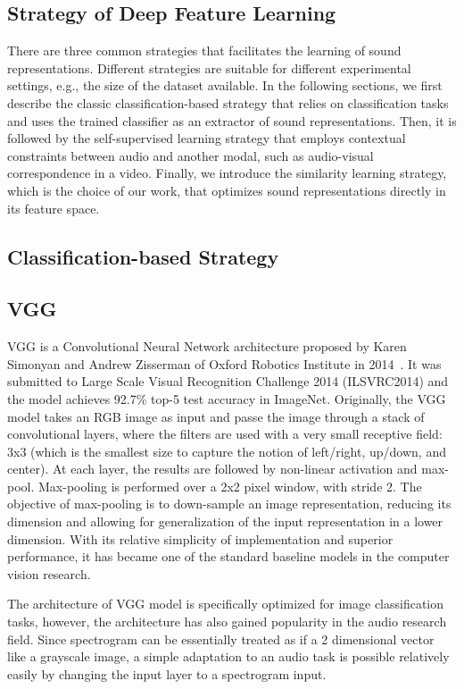 \subsection{Strategy of Deep Feature Learning}
There are three common strategies that facilitates the learning of sound representations. Different strategies are suitable for different experimental settings, e.g., the size of the dataset available. In the following sections, we first describe the classic classification-based strategy that relies on classification tasks and uses the trained classifier as an extractor of sound representations. Then, it is followed by the self-supervised learning strategy that employs contextual constraints between audio and another modal, such as audio-visual correspondence in a video. Finally, we introduce the similarity learning strategy, which is the choice of our work, that optimizes sound representations directly in its feature space.

\subsection{Classification-based Strategy}

\subsection{VGG}
VGG is a Convolutional Neural Network architecture proposed by Karen Simonyan and Andrew Zisserman of Oxford Robotics Institute in 2014~\cite{simonyan2015}. It was submitted to Large Scale Visual Recognition Challenge 2014 (ILSVRC2014) and the model achieves 92.7\% top-5 test accuracy in ImageNet.
Originally, the VGG model takes an RGB image as input and passe the image through a stack of convolutional layers, where the filters are used with a very small receptive field: 3x3 (which is the smallest size to capture the notion of left/right, up/down, and center). At each layer, the results are followed by non-linear activation and max-pool. Max-pooling is performed over a 2x2 pixel window, with stride 2. The objective of max-pooling is to down-sample an image representation, reducing its dimension and allowing for generalization of the input representation in a lower dimension.
With its relative simplicity of implementation and superior performance, it has became one of the standard baseline models in the computer vision research.

The architecture of VGG model is specifically optimized for image classification tasks, however, the architecture has also gained popularity in the audio research field. Since spectrogram can be essentially treated as if a 2 dimensional vector like a grayscale image, a simple adaptation to an audio task is possible relatively easily by changing the input layer to a spectrogram input.

